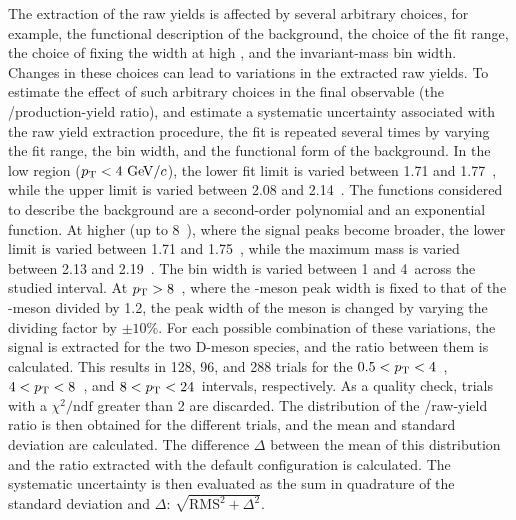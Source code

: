 The extraction of the raw yields is affected by several arbitrary choices, for example, the functional description of the background, the choice of the fit range, the choice of fixing the \dpl width at high \pt, and the invariant-mass bin width. Changes in these choices can lead to variations in the extracted raw yields. To estimate the effect of such arbitrary choices in the final observable (the \ds/\dpl production-yield ratio), and estimate a systematic uncertainty associated with the raw yield extraction procedure, the fit is repeated several times by varying the fit range, the bin width, and the functional form of the background. In the low \pt region ($p_\mathrm{T}<4~\mathrm{Ge\kern-.1emV}/c$), the lower fit limit is varied between 1.71 and 1.77~\gevcc, while the upper limit is varied between 2.08 and 2.14~\gevcc. The functions considered to describe the background are a second-order polynomial and an exponential function. At higher \pt (up to 8~\gevc), where the signal peaks become broader, the lower limit is varied between 1.71 and 1.75~\gevcc, while the maximum mass is varied between 2.13 and 2.19~\gevcc. The bin width is varied between 1 and 4~\mevcc across the studied \pt interval. At $p_\mathrm{T}>8$~\gevcc, where the \dpl-meson peak width is fixed to that of the \ds-meson divided by 1.2, the peak width of the \dpl meson is changed by varying the dividing factor by $\pm10\%$. For each possible combination of these variations, the signal is extracted for the two D-meson species, and the ratio between them is calculated. This results in 128, 96, and 288 trials for the $0.5<p_\mathrm{T}<4$~\gevc, $4<p_\mathrm{T}<8$~\gevc, and $8<p_\mathrm{T}<24$~\gevc intervals, respectively. As a quality check, trials with a $\chi^2/\mathrm{ndf}$ greater than 2 are discarded. The distribution of the \ds/\dpl raw-yield ratio is then obtained for the different trials, and the mean and standard deviation are calculated. The difference $\Delta$ between the mean of this distribution and the ratio extracted with the default configuration is calculated. The systematic uncertainty is then evaluated as the sum in quadrature of the standard deviation and $\Delta$: $\sqrt{\mathrm{RMS^2}+\Delta^2}$.

